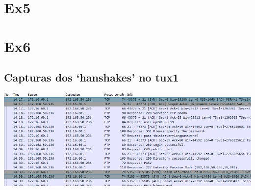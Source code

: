 \documentclass[11pt,a4paper,reqno]{report}
\numberwithin{equation}{section}
\begin{document}
\begin{appendices}
\section{Ex5}%

\section{Ex6}%

\subsection{Capturas dos `hanshakes' no tux1}
\label{ex6_tux1_handshakes}
\includegraphics[width=18cm]{ex6_tux1_handshakes.png}


\end{appendices}
\end{document}
